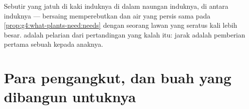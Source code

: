 \begin{example}\label{ex:g6:how-plants-spread:whyleave}
Sebutir  yang jatuh di kaki induknya  di dalam naungan
induknya, di antara  induknya --- bersaing memperebutkan 
dan air yang persis sama pada
\cref{prop:g4:what-plants-need:needs} dengan seorang lawan yang
seratus kali lebih besar.  adalah pelarian dari pertandingan
yang kalah itu: jarak adalah pemberian pertama sebuah  kepada
anaknya.
\end{example}

\section{Para pengangkut, dan buah yang dibangun untuknya}

